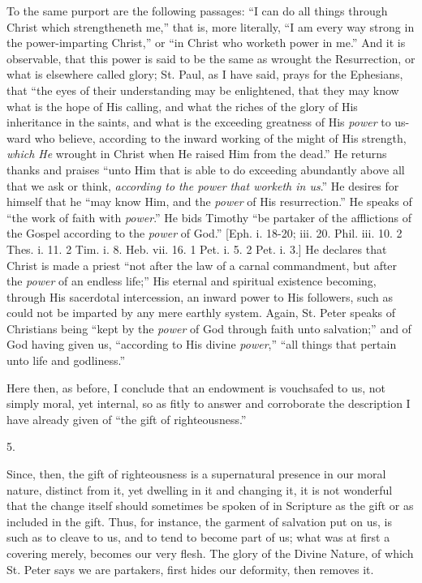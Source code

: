 To the same purport are the following passages: ``I can do all
things through Christ which strengtheneth me,'' that is, more
literally, ``I am every way strong in the power-imparting
Christ,'' or ``in Christ who worketh power in me.'' And it
is observable, that this power is said to be the same as wrought the
Resurrection, or what is elsewhere called glory; St. Paul, as I have
said, prays for the Ephesians, that ``the eyes of their
understanding may be enlightened, that they may know what is the
hope of His calling, and what the riches of the glory of His
inheritance in the saints, and what is the exceeding greatness of His \emph{power}
to us-ward who believe, according to the inward working of the might
of His strength, \emph{which He} wrought in Christ when He raised Him
from the dead.'' He returns thanks and praises ``unto Him that
is able to do exceeding abundantly above all that we ask or think, \emph{according
to the power that worketh in us}.'' He desires for himself that
he ``may know Him, and the \emph{power} of His resurrection.''
He speaks of ``the work of faith with \emph{power}.'' He bids
Timothy ``be partaker of the afflictions of the Gospel according
to the \emph{power} of God.'' [Eph. i. 18-20; iii. 20. Phil. iii.
10. 2 Thes. i. 11. 2 Tim. i. 8. Heb. vii. 16. 1 Pet. i. 5. 2 Pet. i.
3.] He declares that Christ is made a priest ``not after the law
of a carnal commandment, but after the \emph{power} of an endless
life;'' His eternal and spiritual existence becoming, through His
sacerdotal intercession, an inward power to His followers, such as
could not be imparted by any mere earthly system. Again, St. Peter
speaks of Christians being ``kept by the \emph{power} of God
through faith unto salvation;'' and of God having given us,
``according to His divine \emph{power},'' ``all things
that pertain unto life and godliness.''

Here then, as before, I conclude that an endowment is vouchsafed to
us, not simply moral, yet internal, so as fitly to answer and
corroborate the description I have already given of ``the gift of
righteousness.''

5.

Since, then, the gift of righteousness is a supernatural presence
in our moral nature, distinct from it, yet dwelling in it and changing
it, it is not wonderful that the change itself should sometimes be
spoken of in Scripture as the gift or as included in the gift. Thus,
for instance, the garment of salvation put on us, is such as to cleave
to us, and to tend to become part of us; what was at first a covering
merely, becomes our very flesh. The glory of the Divine Nature, of
which St. Peter says we are partakers, first hides our deformity, then
removes it.

